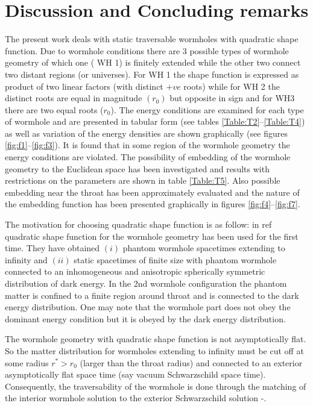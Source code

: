 \documentclass[10pt]{revtex4}
\begin{document}
\section{Discussion and Concluding remarks}
\label{sec:vii}
The present work deals with static traversable wormholes with quadratic shape function. Due to wormhole conditions there are 3 possible types of wormhole geometry of which one ( WH 1) is finitely extended while the other two connect two distant regions (or universes). For WH 1 the shape function is expressed as product of two linear factors (with distinct $+ve$ roots) while for WH 2 the distinct roots are equal in magnitude $(r_0)$ but opposite in sign and for WH3 there are two equal roots ($r_0$). The energy conditions are examined for each type of wormhole and are presented in tabular form (see tables \ref{Table:T2}--\ref{Table:T4}) as well as variation of the energy densities are shown graphically (see figures \ref{fig:f1}--\ref{fig:f3}). It is found that in some region of the wormhole geometry the energy conditions are violated. The possibility of embedding of the wormhole geometry to the Euclidean space has been investigated and results with restrictions on the parameters are shown in table \ref{Table:T5}. Also possible embedding near the throat has been approximately evaluated and the nature of the embedding function has been presented graphically in figures \ref{fig:f4}--\ref{fig:f7}.
\par 
The motivation for choosing quadratic shape function is as follow: in ref\cite{r20} quadratic shape function for the wormhole geometry has been used for the first time. They have obtained $(i)$ phantom wormhole spacetimes extending to infinity and $(ii)$ static spacetimes of finite size with phantom wormhole connected to an inhomogeneous and anisotropic spherically symmetric distribution of dark energy. In the 2nd wormhole configuration the phantom matter is confined to a finite region around throat and is connected to the dark energy distribution. One may note that the wormhole part does not obey the dominant energy condition but it is obeyed by the dark energy distribution.
\par 
The wormhole geometry with quadratic shape function is not asymptotically flat. So the matter distribution for wormholes extending to infinity must be cut off at some radius $r^*>r_0$ (larger than the throat radius) and connected to an exterior asymptotically flat space time (say vacuum Schwarzschild space time). Consequently, the traversability of the wormhole is done through the matching of the interior wormhole solution to the exterior Schwarzschild solution \cite{r29}-\cite{r30}.
\end{document}
